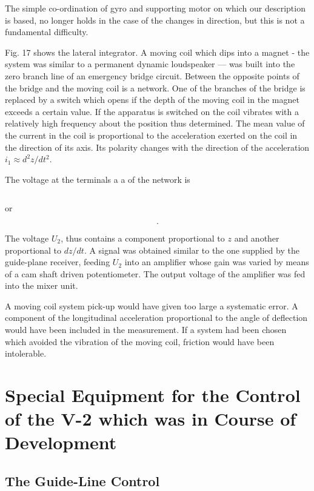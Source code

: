 \documentclass[12pt, a4paper]{article}
\begin{document}
The simple co-ordination of gyro and supporting motor on which our description is based, no longer holds in the case of the changes in direction, but this is not a fundamental difficulty.

Fig. 17 shows the lateral integrator. A moving coil which dips into a magnet - the system was similar to a permanent dynamic loudspeaker — was built into the zero branch line of an emergency bridge circuit. Between the opposite points of the bridge and the moving coil is a network. One of the branches of the bridge is replaced by a switch which opens if the depth of the moving coil in the magnet exceeds a certain value. If the apparatus is switched on the coil vibrates with a relatively high frequency about the position thus determined. The mean value of the current in the coil is proportional to the acceleration exerted on the coil in the direction of its axis. Its polarity changes with the direction of the acceleration $i_{1}\approx d^{2}z/dt^{2}$.

The voltage at the terminals a a of the network is

\begin{equation}
\end{equation}

or

\begin{equation}
  .
\end{equation}

The voltage $U_{2}$, thus contains a component proportional to $z$ and another proportional to $dz/dt$. A signal was obtained similar to the one supplied by the guide-plane receiver, feeding $U_{2}$ into an amplifier whose gain was varied by means of a cam shaft driven potentiometer. The output voltage of the amplifier was fed into the mixer unit.

A moving coil system pick-up would have given too large a systematic error. A component of the longitudinal acceleration proportional to the angle of deflection would have been included in the measurement. If a system had been chosen which avoided the vibration of the moving coil, friction would have been intolerable.

\section{Special Equipment for the Control of the V-2 which was in Course of Development}

\subsection{The Guide-Line Control}
\end{document}
